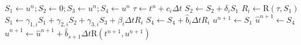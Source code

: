     \centering
    \caption{Embedded-pair low storage implementation (3S*$\!{}_+$)}
    \label{ALG:Time:Algorithms:EPERK}
    \begin{algorithmic}[1]
      \STATE $S_1 \leftarrow u^n ;
              S_2 \leftarrow 0 ;
              S_3 \leftarrow u^n ;
              S_4 \leftarrow u^n $
      \STATE $\tau \leftarrow t^n + c_i \Delta t$
      \STATE $S_2 \leftarrow S_2 + \delta_i S_1$
      \STATE $R_i \leftarrow \bm{\mathrm{R}}\left(\tau,S_1\right)$
      \STATE $S_1 \leftarrow \gamma_{1,i} S_1 + 
                             \gamma_{2,i} S_2 +
                             \gamma_{3,i} S_3 + 
                      \beta_i \Delta t R_i$
      \STATE $S_4 \leftarrow S_4 + 
                      \hat{b}_i \Delta t R_i$
      \ENDFOR
      \STATE $u^{n+1} \leftarrow S_1$
      \STATE $\hat{u}^{n+1} \leftarrow S_4$
      \STATE $\hat{u}^{n+1} \leftarrow \hat{u}^{n+1} +
            \hat{b}_{s+1} \Delta t \bm{\mathrm{R}}\left(t^{n+1},u^{n+1}\right)$
      \ENDIF
    \end{algorithmic}
